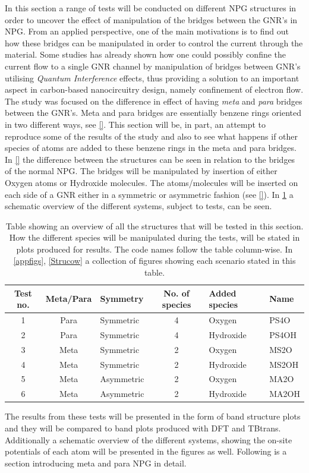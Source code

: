 In this section a range of tests will be conducted on different NPG structures in order to uncover the effect of manipulation of the bridges between the GNR's in NPG. From an applied perspective, one of the main motivations is to find out how these bridges can be manipulated in order to control the current through the material. Some studies has already shown how one could possibly confine the current flow to a single GNR channel by manipulation of bridges between GNR's utilising \textit{Quantum Interference} effects, thus providing a solution to an important aspect in carbon-based nanocircuitry design, namely confinement of electron flow. The study was focused on the difference in effect of having \textit{meta} and \textit{para} bridges between the GNR's. Meta and para bridges are essentially benzene rings oriented in two different ways, see \cref{}. This section will be, in part, an attempt to reproduce some of the results of the study and also to see what happens if other species of atoms are added to these benzene rings in the meta and para bridges. In \cref{} the difference between the structures can be seen in relation to the bridges of the normal NPG. The bridges will be manipulated by insertion of either Oxygen atoms or Hydroxide molecules. The atoms/molecules will be inserted on each side of a GNR either in a symmetric or asymmetric fashion (see \cref{}). In \cref{testtable} a schematic overview of the different systems, subject to tests, can be seen. 
\begin{table}[ht]
\begin{tabular}{cclcll}
		\toprule
		Test no. & Meta/Para & Symmetry   & No. of species & Added species & Name  \\ \midrule
		1        & Para      & Symmetric  & 4              & Oxygen        & PS4O  \\
		2        & Para      & Symmetric  & 4              & Hydroxide     & PS4OH \\
		3        & Meta      & Symmetric  & 2              & Oxygen        & MS2O  \\
		4        & Meta      & Symmetric  & 2              & Hydroxide     & MS2OH \\
		5        & Meta      & Asymmetric & 2              & Oxygen        & MA2O  \\
		6        & Meta      & Asymmetric & 2              & Hydroxide     & MA2OH \\
		\bottomrule
	\end{tabular}
	\caption{Table showing an overview of all the structures that will be tested in this section.  How the different species will be manipulated during the tests, will be stated in plots produced for results. The code names follow the table column-wise. In \cref{appfigs}, \cref{Strucow} a collection of figures showing each scenario stated in this table.}
\label{testtable}
\end{table}
The results from these tests will be presented in the form of band structure plots and they will be compared to band plots produced with DFT and TBtrans. Additionally a schematic overview of the different systems, showing the on-site potentials of each atom will be presented in the figures as well. Following is a section introducing meta and para NPG in detail. 
